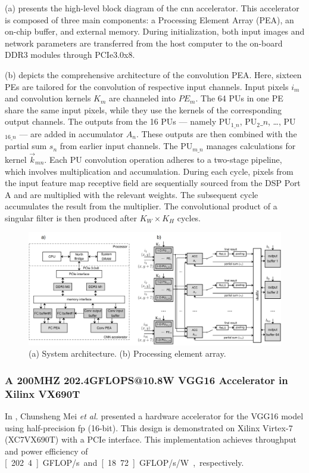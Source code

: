 (a) presents the high-level block diagram of the \gls{cnn} accelerator. This accelerator is composed of three main components: a Processing Element Array (PEA), an on-chip buffer, and external memory. During initialization, both input images and network parameters are transferred from the host computer to the on-board DDR3 modules through PCIe3.0x8.

(b) depicts the comprehensive architecture of the convolution PEA. Here, sixteen PEs are tailored for the convolution of respective input channels. Input pixels \(i_m\) and convolution kernels \(K_m\) are channeled into \(PE_m\). The 64 PUs in one PE share the same input pixels, while they use the kernels of the corresponding output channels. The outputs from the 16 PUs --- namely PU\(_{1\_n}\), PU\(_2\_n\), \ldots, PU\(_{16\_n}\) --- are added in accumulator \(A_n\). These outputs are then combined with the partial sum \(s_n\) from earlier input channels. The PU\(_{m\_n}\) manages calculations for kernel \(\vec{k}_{mn}\). Each PU convolution operation adheres to a two-stage pipeline, which involves multiplication and accumulation. During each cycle, pixels from the input feature map receptive field are sequentially sourced from the DSP Port A and are multiplied with the relevant weights. The subsequent cycle accumulates the result from the multiplier. The convolutional product of a singular filter is then produced after \(K_W \times K_H\) cycles.


\begin{figure}[h!]
	\centering
	\includegraphics[width=\textwidth]{./figures/3_g.png}
	\caption{(a) System architecture. (b) Processing element array.}
	\label{fig:lian2019high}
\end{figure}
\FloatBarrier

\subsubsection{A 200MHZ 202.4GFLOPS@10.8W VGG16 Accelerator in Xilinx VX690T}
In \cite{mei2017200mhz}, Chunsheng Mei \textit{et al.} presented a hardware accelerator for the VGG16 model using half-precision \gls{fp} (16-bit). This design is demonstrated on Xilinx Virtex-7 (XC7VX690T) with a PCIe interface. This implementation achieves throughput and power efficiency of \unit[202.4]{GFLOP/s} and \unit[18.72]{GFLOP/s/W}, respectively.

